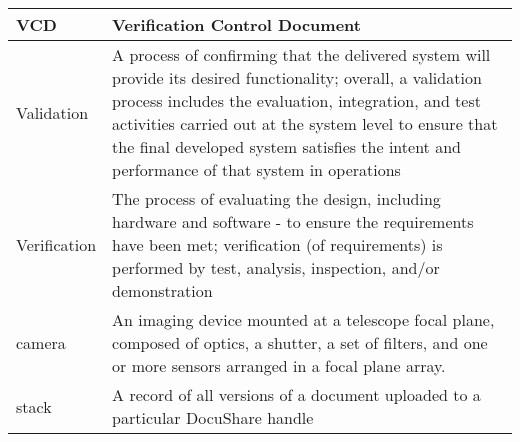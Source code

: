 \begin{longtable}{|l|p{}|}
VCD & Verification Control Document \\\hline
Validation & A process of confirming that the delivered system will provide its desired functionality; overall, a validation process includes the evaluation, integration, and test activities carried out at the system level to ensure that the final developed system satisfies the intent and performance of that system in operations \\\hline
Verification & The process of evaluating the design, including hardware and software - to ensure the requirements have been met;  verification (of requirements) is performed by test, analysis, inspection, and/or demonstration \\\hline
camera & An imaging device mounted at a telescope focal plane, composed of optics, a shutter, a set of filters, and one or more sensors arranged in a focal plane array. \\\hline
stack & A record of all versions of a document uploaded to a particular DocuShare handle \\\hline
\end{longtable}
